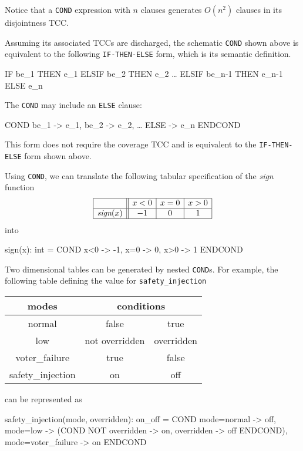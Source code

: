 Notice that a \texttt{COND} expression with $n$ clauses generates $O(n^2)$
clauses in its disjointness TCC\@.  

Assuming its associated TCCs are discharged, the schematic \texttt{COND}
shown above is equivalent to the following \texttt{IF-THEN-ELSE} form,
which is its semantic definition.

\begin{pvsex}
  IF be\_1 THEN e\_1
  ELSIF be\_2 THEN e\_2
          \ldots
  ELSIF be\_n-1 THEN e\_n-1
  ELSE e\_n
\end{pvsex}

The \texttt{COND} may include an \texttt{ELSE} clause:
\begin{pvsex}
  COND
      be\_1 -> e\_1,
      be\_2 -> e\_2,
        \ldots
      ELSE -> e\_n
  ENDCOND
\end{pvsex}
This form does not require the coverage TCC and is equivalent to the
\texttt{IF-THEN-ELSE} form shown above.

Using \texttt{COND}, we can translate the following tabular
specification of the \emph{sign} function
\[
\begin{array}{|c||c|c|c|}
\hline
 & x<0 & x=0 & x>0\\
\hline
\emph{sign}(x) & -1 & 0 & 1\\
\hline
\end{array}
\]
into
\begin{pvsex}
  sign(x): int = COND
                    x<0 -> -1, 
                    x=0 -> 0,
                    x>0 -> 1
                 ENDCOND
\end{pvsex}

Two dimensional tables can be generated by nested \texttt{COND}s.  For
example, the following table defining the value for \texttt{safety\_injection}
\begin{center}
\begin{tabular}{|c||c|c|}
\hline
modes & \multicolumn{2}{c|}{conditions} \\
\hline
\hline
normal & false & true\\
\hline
low & not overridden & overridden \\
\hline
voter\_failure & true & false\\
\hline
\hline
safety\_injection & on & off\\
\hline
\end{tabular}
\end{center}
can be represented as
\begin{pvsex}
  safety\_injection(mode, overridden): on\_off = 
    COND
      mode=normal -> off,
      mode=low -> (COND NOT overridden -> on, overridden -> off ENDCOND),
      mode=voter\_failure -> on
    ENDCOND
\end{pvsex}

